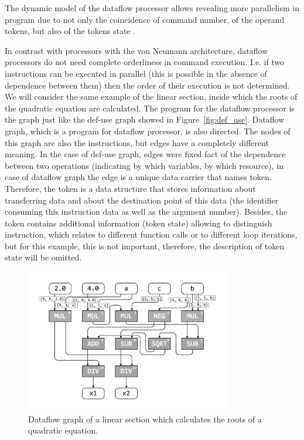 \documentclass[
11pt,%
tightenlines,%
twoside,%
onecolumn,%
nofloats,%
nobibnotes,%
nofootinbib,%
superscriptaddress,%
noshowpacs,%
centertags]%
{revtex4}
\begin{document}
The dynamic model of the dataflow processor allows revealing more parallelism in program due to not only the coincidence of command number, of the operand tokens, but also of the tokens state \cite{Wiley}.

In contrast with processors with the von Neumann architecture, dataflow processors do not need complete orderliness in command execution.
I.e. if two instructions can be executed in parallel (this is possible in the absence of dependence between them) then the order of their execution is not determined.
We will consider the same example of the linear section, inside which the roots of the quadratic equation are calculated.
The program for the dataflow processor is the graph just like the def-use graph showed in Figure~\ref{fig:def_use}.
Dataflow graph, which is a program for dataflow processor, is also directed.
The nodes of this graph are also the instructions, but edges have a completely different meaning.
In the case of def-use graph, edges were fixed fact of the dependence between two operations (indicating by which variables, by which resource), in case of dataflow graph the edge is a unique data carrier that names token.
Therefore, the token is a data structure that stores information about transferring data and about the destination point of this data (the identifier consuming this instruction data as well as the argument number).
Besides, the token contains additional information (token state) allowing to distinguish instruction, which relates to different function calls or to different loop iterations, but for this example, this is not important, therefore, the description of token state will be omitted.

\begin{figure}[h]
\includegraphics[width=0.80\textwidth]{pics/dataflow.pdf}
\caption{Dataflow graph of a linear section which calculates the roots of a quadratic equation.}\label{fig:dataflow}
\end{figure}
\end{document}
